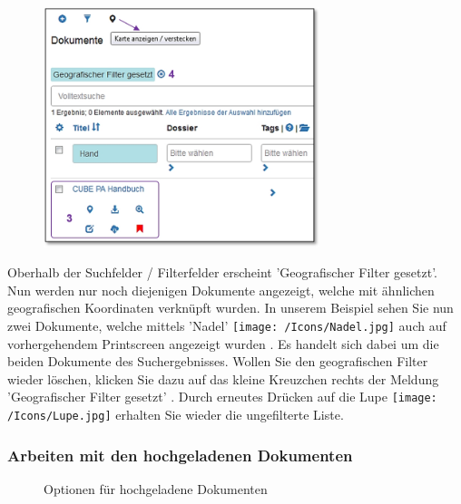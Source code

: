 \begin{figure}
  \vspace{-25pt} 
  \begin{center}
    \includegraphics[height=70mm]{../chapters/11_Dokumentenablage/pictures/11-2-3_GeoBereichResult.jpg}
  \end{center}
  \vspace{-20pt}
  \vspace{-10pt}
\end{figure}
Oberhalb der Suchfelder / Filterfelder erscheint 'Geografischer Filter gesetzt'. Nun werden nur noch diejenigen Dokumente angezeigt, welche mit ähnlichen geografischen Koordinaten verknüpft wurden. In unserem Beispiel sehen Sie nun zwei Dokumente, welche mittels 'Nadel' \texttt{[image: /Icons/Nadel.jpg]} auch auf vorhergehendem Printscreen angezeigt wurden . Es handelt sich dabei um die beiden Dokumente des Suchergebnisses. Wollen Sie den geografischen Filter wieder löschen, klicken Sie dazu auf das kleine Kreuzchen rechts der Meldung 'Geografischer Filter gesetzt' . Durch erneutes Drücken auf die Lupe \texttt{[image: /Icons/Lupe.jpg]} erhalten Sie wieder die ungefilterte Liste.

\subsubsection{Arbeiten mit den hochgeladenen Dokumenten}
\label{bkm:Ref442801819}

\begin{figure}[H]
\caption{Optionen für hochgeladene Dokumenten}
\end{figure}


